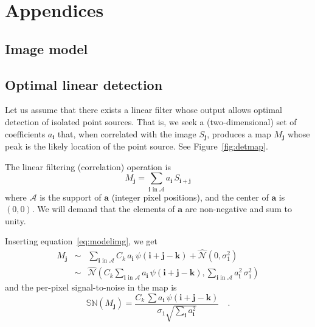 \documentclass[letterpaper,preprint]{aastex}
\newcommand{\equationname}{equation}
\newcommand{\eqnref}[1]{\mbox{\equationname~\ref{#1}}}
\newcommand{\fig}{Figure}
\newcommand{\figref}[1]{\mbox{\fig~\ref{#1}}}
\newcommand{\drawnfrom}{\sim}
\newcommand{\gaussianN}{\mathcal{N}}
\newcommand{\gaussx}[1]{\hat{\gaussianN}\!\left(#1\right)}
\newcommand{\signoise}{[S/N]}
\newcommand{\snr}[1]{\mathbb{SN}(#1)}
\renewcommand{\vec}[1]{\boldsymbol{#1}}
\newcommand{\avec}{\vec{a}}
\newcommand{\ivec}{\vec{i}}
\newcommand{\jvec}{\vec{j}}
\newcommand{\kvec}{\vec{k}}
\newcommand{\coord}[2]{(#1, #2)}
\newcommand{\iina}{\ivec \,\, \mathrm{in} \,\, \mathcal{A}}
\begin{document}
\appendix

\section{Appendices}

\subsection{Image model}
\label{app:model}



\subsection{Optimal linear detection}
\label{app:lindet}

Let us assume that there exists a linear filter whose output allows
optimal detection of isolated point sources.  That is, we seek a
(two-dimensional) set of coefficients $a_{\ivec}$ that, when
correlated with the image $S_{\jvec}$, produces a map $M_{\jvec}$
whose peak is the likely location of the point source.  See
\figref{fig:detmap}.


The linear filtering (correlation) operation is
\begin{equation}
M_{\jvec} = \sum_{\iina} a_{\ivec} \, S_{\ivec + \jvec}
\label{eq:detmap1}
\end{equation}
where $\mathcal{A}$ is the support of $\avec$ (integer pixel
positions), and the center of $\avec$ is $\coord{0}{0}$.  We will
demand that the elements of $\avec$ are non-negative and sum to unity.

Inserting \eqnref{eq:modelimg}, we get
\begin{eqnarray}
M_{\jvec} &\drawnfrom& \sum_{\iina}
  C_k \, a_{\ivec} \, \psi(\ivec + \jvec - \kvec) + \gaussx{0, \sigma_1^2}
  \\
&\drawnfrom& \gaussx{ C_k \sum_{\iina} a_{\ivec} \, \psi(\ivec + \jvec - \kvec),
    \sum_{\iina} a_{\ivec}^2 \, \sigma_1^2}
\end{eqnarray}
and the per-pixel signal-to-noise in the map is
\begin{equation}
  \snr{M_{\jvec}} = \frac{C_k \, \sum a_{\ivec} \, \psi(\ivec + \jvec - \kvec)}{\sigma_1 \sqrt{\sum_{\ivec} a_{\ivec}^2}} \quad .
  \label{eq:detmapsn1}
\end{equation}
\end{document}

